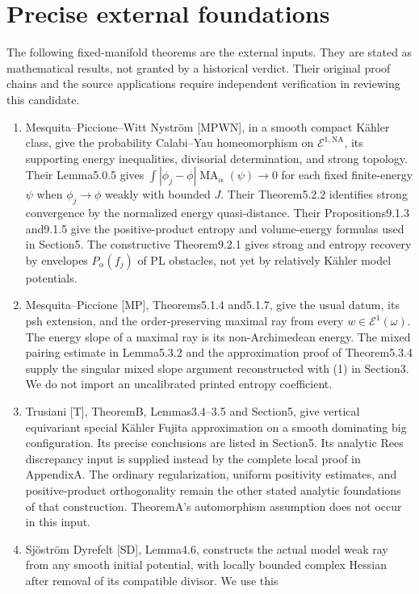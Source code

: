 \documentclass[11pt]{article}
\newcommand{\MA}{\operatorname{MA}}
\newcommand{\NA}{\mathrm{NA}}
\begin{document}
\section{Precise external foundations}
The following fixed-manifold theorems are the external inputs. They
are stated as mathematical results, not granted by a historical verdict.
Their original proof chains and the source applications require
independent verification in reviewing this candidate.
\begin{enumerate}
\item Mesquita--Piccione--Witt Nystr\"om [MPWN], in a smooth compact
K\"ahler class, give the probability Calabi--Yau homeomorphism on
$\mathcal E^{1,\NA}$, its supporting energy inequalities, divisorial
determination, and strong topology. Their Lemma5.0.5 gives
$\int|\phi_j-\phi|\MA_\alpha(\psi)\to0$ for each fixed finite-energy
$\psi$ when $\phi_j\to\phi$ weakly with bounded $J$.
Their Theorem5.2.2 identifies strong convergence by the normalized
energy quasi-distance. Their Propositions9.1.3 and9.1.5 give the
positive-product entropy and volume-energy formulas used in Section5.
The constructive Theorem9.2.1 gives strong and entropy recovery by
envelopes $P_\alpha(f_j)$ of PL obstacles, not yet by relatively
K\"ahler model potentials.
\item Mesquita--Piccione [MP], Theorems5.1.4 and5.1.7, give the usual
datum, its psh extension, and the order-preserving maximal ray from
every $w\in\mathcal E^1(\omega)$. The energy slope of a maximal ray is
its non-Archimedean energy. The mixed pairing estimate in Lemma5.3.2
and the approximation proof of Theorem5.3.4 supply the singular mixed
slope argument reconstructed with (1) in Section3. We do not import
an uncalibrated printed entropy coefficient.
\item Trusiani [T], TheoremB, Lemmas3.4--3.5 and Section5, give
vertical equivariant special K\"ahler Fujita approximation on a smooth
dominating big configuration. Its precise conclusions are listed in
Section5. Its analytic Rees discrepancy input is supplied instead by
the complete local proof in AppendixA. The ordinary regularization,
uniform positivity estimates, and positive-product orthogonality
remain the other stated analytic foundations of that construction.
TheoremA's automorphism assumption does not occur in this input.
\item Sj\"ostr\"om Dyrefelt [SD], Lemma4.6, constructs the actual
model weak ray from any smooth initial potential, with locally bounded
complex Hessian after removal of its compatible divisor. We use this

\end{enumerate}
\end{document}
